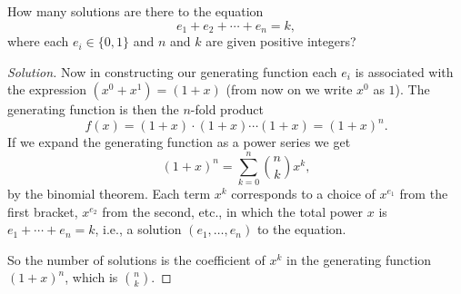 \documentclass[10pt, a4paper]{article}
\begin{document}
\begin{example}
    How many solutions are there to the equation
    \[
    e_1 + e_2 + \dotsi + e_n = k,
    \]
    where each $e_i \in \{0, 1\}$ and $n$ and $k$ are given positive integers?
    \begin{proof}[Solution]\renewcommand{\qedsymbol}{}
        Now in constructing our generating function each $e_i$ is associated with the expression $(x ^ 0 + x ^ 1) = (1 + x)$
        (from now on we write $x ^ 0$ as $1$).
        The generating function is then the $n$-fold product
        \[
        f(x) = (1 + x)\cdot(1 + x)\dotsi(1 + x) = (1 + x) ^ n.
        \]
        If we expand the generating function as a power series we get
        \[
        (1 + x) ^ n = \sum_{k = 0}^{n}\binom{n}{k}x ^ k,
        \]
        by the binomial theorem.
        Each term $x ^ k$ corresponds to a choice of $x ^ {e_1}$ from the first bracket,
        $x ^ {e_2}$ from the second,
        etc.,
        in which the total power $x$ is $e_1 + \dotsi + e_n = k$,
        i.e.,
        a solution $(e_1, \dotsc, e_n)$ to the equation.

        So the number of solutions is the coefficient of $x ^ k$ in the generating function $(1 + x) ^ n$,
        which is $\binom{n}{k}$.
    \end{proof}
\end{example}
\end{document}
